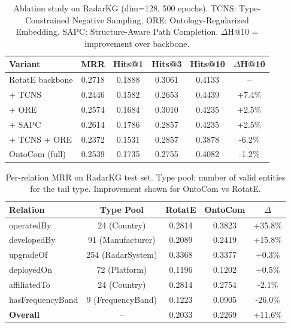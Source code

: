 \begin{table}[h]
\centering
\caption{Ablation study on RadarKG (dim=128, 500 epochs).
TCNS: Type-Constrained Negative Sampling.
ORE: Ontology-Regularized Embedding.
SAPC: Structure-Aware Path Completion.
$\Delta$H@10 = improvement over backbone.}
\label{tab:ablation}
\begin{tabular}{lccccc}
\toprule
Variant & MRR & Hits@1 & Hits@3 & Hits@10 & $\Delta$H@10 \\
\midrule
RotatE backbone & 0.2718 & 0.1888 & 0.3061 & 0.4133 & -- \\
\quad + TCNS & 0.2446 & 0.1582 & 0.2653 & 0.4439 & +7.4\% \\
\quad + ORE & 0.2574 & 0.1684 & 0.3010 & 0.4235 & +2.5\% \\
\quad + SAPC & 0.2614 & 0.1786 & 0.2857 & 0.4235 & +2.5\% \\
\quad + TCNS + ORE & 0.2372 & 0.1531 & 0.2857 & 0.3878 & -6.2\% \\
\midrule
OntoCom (full) & 0.2539 & 0.1735 & 0.2755 & 0.4082 & -1.2\% \\
\bottomrule
\end{tabular}
\end{table}

\begin{table}[h]
\centering
\caption{Per-relation MRR on RadarKG test set.
Type pool: number of valid entities for the tail type.
Improvement shown for OntoCom vs RotatE.}
\label{tab:per_relation}
\begin{tabular}{lcccc}
\toprule
Relation & Type Pool & RotatE & OntoCom & $\Delta$ \\
\midrule
operatedBy & 24 (Country) & 0.2814 & 0.3823 & +35.8\% \\
developedBy & 91 (Manufacturer) & 0.2089 & 0.2419 & +15.8\% \\
upgradeOf & 254 (RadarSystem) & 0.3368 & 0.3377 & +0.3\% \\
deployedOn & 72 (Platform) & 0.1196 & 0.1202 & +0.5\% \\
affiliatedTo & 24 (Country) & 0.2814 & 0.2754 & -2.1\% \\
hasFrequencyBand & 9 (FrequencyBand) & 0.1223 & 0.0905 & -26.0\% \\
\midrule
\textbf{Overall} & -- & 0.2033 & 0.2269 & +11.6\% \\
\bottomrule
\end{tabular}
\end{table}


